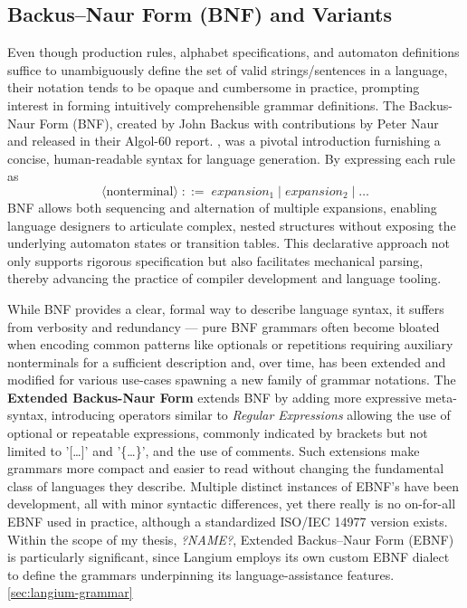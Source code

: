 \documentclass[11pt]{report}
\begin{document}
\subsection{Backus–Naur Form (BNF) and Variants}
Even though production rules, alphabet specifications, and automaton definitions suffice to unambiguously define the set of valid strings/sentences in a language, their notation
tends to be opaque and cumbersome in practice, prompting interest in forming intuitively comprehensible grammar definitions. The Backus-Naur Form (BNF),
created by John Backus with contributions by Peter Naur and released in their Algol-60 report. \cite{ALGOL60}, was a pivotal introduction furnishing a concise, human-readable syntax for language generation.
By expressing each rule as  
\[
\langle\mathrm{nonterminal}\rangle \;::=\; expansion_1 \;|\; expansion_2 \;|\;\dots
\]
BNF allows both sequencing and alternation of multiple expansions, enabling language designers to articulate complex, nested structures without exposing the underlying
automaton states or transition tables. This declarative approach not only supports rigorous specification but also facilitates mechanical parsing, thereby advancing the practice of compiler development and language tooling.

While BNF provides a clear, formal way to describe language syntax, it suffers from verbosity and redundancy — pure BNF grammars often become bloated when encoding 
common patterns like optionals or repetitions requiring auxiliary nonterminals for a sufficient description and, over time, has been extended and modified for various 
use-cases spawning a new family of grammar notations. The \textbf{Extended Backus-Naur Form} extends BNF by adding more expressive meta-syntax, introducing operators 
similar to \textit{Regular Expressions} allowing the use of optional or repeatable expressions, commonly indicated by brackets but not limited to '[\dots]' and '\{\dots\}',
and the use of comments. Such extensions make grammars more compact and easier to read without changing the fundamental class of languages they describe.\cite{}
Multiple distinct instances of EBNF's have been development, all with minor syntactic differences, yet there really is no on-for-all EBNF used in practice, although
a standardized ISO/IEC 14977 version exists. \cite{jinks2004bnf,jinks2004ebnfvariants}\\
Within the scope of my thesis, \textit{?NAME?}, Extended Backus–Naur Form (EBNF) is particularly significant, since Langium employs its own custom EBNF dialect
to define the grammars underpinning its language-assistance features. \ref{sec:langium-grammar}
\end{document}
